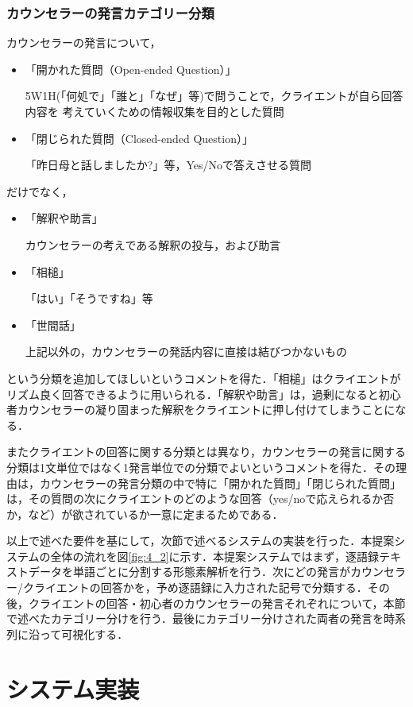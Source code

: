 \documentclass[shuuron]{kuee}
\begin{document}
\subsubsection{カウンセラーの発言カテゴリー分類}

カウンセラーの発言について，
\begin{itemize}
  \item 「開かれた質問（Open-ended Question）」

  5W1H(「何処で」「誰と」「なぜ」等)で問うことで，クライエントが自ら回答内容を
  考えていくための情報収集を目的とした質問
  \item 「閉じられた質問（Closed-ended Question）」

  「昨日母と話しましたか?」等，Yes/Noで答えさせる質問
\end{itemize}
だけでなく，
\begin{itemize}
  \item 「解釈や助言」

  カウンセラーの考えである解釈の投与，および助言
  \item 「相槌」

  「はい」「そうですね」等
  \item 「世間話」

  上記以外の，カウンセラーの発話内容に直接は結びつかないもの
\end{itemize}
という分類を追加してほしいというコメントを得た．「相槌」はクライエントがリズム良く回答できるように用いられる．「解釈や助言」は，過剰になると初心者カウンセラーの凝り固まった解釈をクライエントに押し付けてしまうことになる．

またクライエントの回答に関する分類とは異なり，カウンセラーの発言に関する分類は1文単位ではなく1発言単位での分類でよいというコメントを得た．その理由は，カウンセラーの発言分類の中で特に「開かれた質問」「閉じられた質問」は，その質問の次にクライエントのどのような回答（yes/noで応えられるか否か，など）が欲されているか一意に定まるためである．

以上で述べた要件を基にして，次節で述べるシステムの実装を行った．本提案システムの全体の流れを図\ref{fig:4_2}に示す．本提案システムではまず，逐語録テキストデータを単語ごとに分割する形態素解析を行う．次にどの発言がカウンセラー/クライエントの回答かを，予め逐語録に入力された記号で分類する．その後，クライエントの回答・初心者のカウンセラーの発言それぞれについて，本節で述べたカテゴリー分けを行う．最後にカテゴリー分けされた両者の発言を時系列に沿って可視化する．

\section{システム実装}
\end{document}
